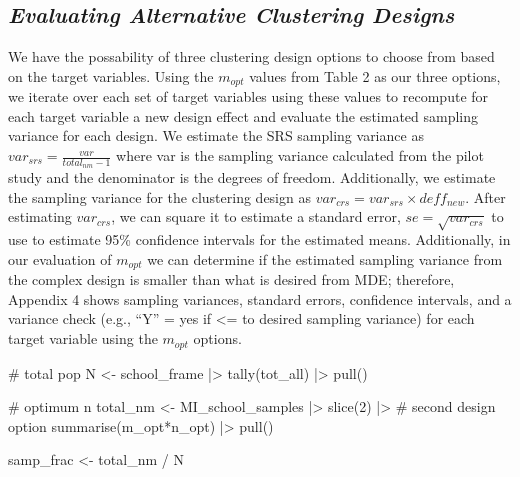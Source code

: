 \documentclass[
  12pt]{article}
\newenvironment{Shaded}{\begin{snugshade}}{\end{snugshade}}
\newcommand{\CommentTok}[1]{\textcolor[rgb]{0.37,0.37,0.37}{#1}}
\newcommand{\DecValTok}[1]{\textcolor[rgb]{0.68,0.00,0.00}{#1}}
\newcommand{\FunctionTok}[1]{\textcolor[rgb]{0.28,0.35,0.67}{#1}}
\newcommand{\NormalTok}[1]{\textcolor[rgb]{0.00,0.23,0.31}{#1}}
\newcommand{\OtherTok}[1]{\textcolor[rgb]{0.00,0.23,0.31}{#1}}
\newcommand{\SpecialCharTok}[1]{\textcolor[rgb]{0.37,0.37,0.37}{#1}}
\begin{document}
\begin{Shaded}
\end{Shaded}

\subsection{\texorpdfstring{\emph{Evaluating Alternative Clustering
Designs}}{Evaluating Alternative Clustering Designs}}\label{evaluating-alternative-clustering-designs}

We have the possability of three clustering design options to choose
from based on the target variables. Using the \(m_{opt}\) values from
Table 2 as our three options, we iterate over each set of target
variables using these values to recompute for each target variable a new
design effect and evaluate the estimated sampling variance for each
design. We estimate the SRS sampling variance as
\(var_{srs} = \frac{var}{total_{nm} - 1}\) where var is the sampling
variance calculated from the pilot study and the denominator is the
degrees of freedom. Additionally, we estimate the sampling variance for
the clustering design as \(var_{crs} = var_{srs} \times deff_{new}\).
After estimating \(var_{crs}\), we can square it to estimate a standard
error, \(se=\sqrt{var_{crs}}\) to use to estimate 95\% confidence
intervals for the estimated means. Additionally, in our evaluation of
\(m_{opt}\) we can determine if the estimated sampling variance from the
complex design is smaller than what is desired from MDE; therefore,
Appendix 4 shows sampling variances, standard errors, confidence
intervals, and a variance check (e.g., ``Y'' = yes if \textless= to
desired sampling variance) for each target variable using the
\(m_{opt}\) options.

\begin{Shaded}
\begin{Highlighting}[]
\CommentTok{\# total pop}
\NormalTok{N }\OtherTok{\textless{}{-}}\NormalTok{ school\_frame }\SpecialCharTok{|\textgreater{}} \FunctionTok{tally}\NormalTok{(tot\_all) }\SpecialCharTok{|\textgreater{}} \FunctionTok{pull}\NormalTok{()}

\CommentTok{\# optimum n}
\NormalTok{total\_nm }\OtherTok{\textless{}{-}}\NormalTok{ MI\_school\_samples }\SpecialCharTok{|\textgreater{}} 
  \FunctionTok{slice}\NormalTok{(}\DecValTok{2}\NormalTok{) }\SpecialCharTok{|\textgreater{}} \CommentTok{\# second design option }
  \FunctionTok{summarise}\NormalTok{(m\_opt}\SpecialCharTok{*}\NormalTok{n\_opt) }\SpecialCharTok{|\textgreater{}} 
  \FunctionTok{pull}\NormalTok{()}

\NormalTok{samp\_frac }\OtherTok{\textless{}{-}}\NormalTok{ total\_nm }\SpecialCharTok{/}\NormalTok{ N}
\end{Highlighting}
\end{Shaded}
\end{document}
